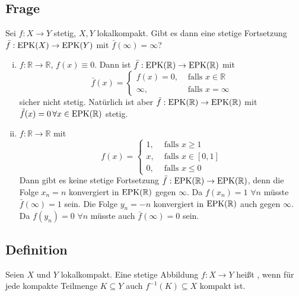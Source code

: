 \subsection[Frage nach Fortsetzungen stetiger Funktionen auf der Einpunktkompaktifizierung]{Frage} %
\label{sub:58}
Sei $f : X \to Y$ stetig, $X,Y$ lokalkompakt. Gibt es dann eine stetige Fortsetzung $\bar{f} : \operatorname{EPK}(X) \to \operatorname{EPK}(Y)$ mit $\bar{f}(\infty) = \infty$?
\begin{enumerate}[(i)]
	\item $f : \mathds{R} \to \mathds{R}$, $f(x) \equiv 0$. Dann ist $\bar{f} : \operatorname{EPK}(\mathbb{R}) \to \operatorname{EPK}(\mathbb{R}) $ mit 
	\[
		\bar{f} (x) = \begin{cases}
			f(x)=0, &\text{ falls }x \in \mathds{R}\\
			\infty , &\text{ falls } x =\infty
		\end{cases}
	\]
	sicher nicht stetig. Natürlich ist aber $\tilde f : \operatorname{EPK}(\mathbb{R}) \to \operatorname{EPK}(\mathbb{R})$ mit $\tilde f (x) = 0 \,\forall x \in \operatorname{EPK}(\mathbb{R})$ stetig.
	\item $f : \mathds{R} \to \mathds{R}$ mit 
	\[
		f(x) = \begin{cases}
			1, &\text{ falls }x \ge 1\\
			x, &\text{ falls }x \in [0,1] \\
			0, &\text{ falls }x \le 0
		\end{cases}
	\]
	Dann gibt es keine stetige Fortsetzung $\bar{f} : \operatorname{EPK}(\mathbb{R}) \to\operatorname{EPK}(\mathbb{R})$, denn die Folge $x_n = n$ konvergiert in $\operatorname{EPK}(\mathbb{R})$ gegen $\infty$.
	Da $f(x_n) = 1$ $\forall n$ müsste $\bar{f} (\infty) = 1 $ sein. Die Folge $y_n = -n$ konvergiert in $\operatorname{EPK}(\mathbb{R})$ auch gegen $\infty$. Da $f(y_n) = 0$
	$\forall n$ müsste auch $\bar{f} (\infty) = 0 $ sein. \light
\end{enumerate}

\subsection[Definition: Eigentliche stetige Abbildung]{Definition} %
\label{sub:59}
Seien $X$ und $Y$ lokalkompakt. Eine stetige Abbildung $f : X \to Y$ heißt , wenn für jede kompakte Teilmenge 
$K \subseteq Y$ auch $f ^{-1}(K) \subseteq X$ kompakt ist.

